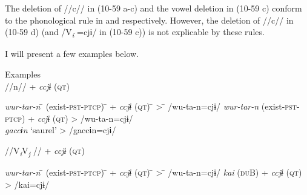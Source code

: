The deletion of //c// in (10-59 a-c) and the vowel deletion in (10-59 c) conform to the phonological rule in  and  respectively. However, the deletion of //c// in (10-59 d) (and /V\textit{\textsubscript{i} }=cjɨ/ in (10-59 c)) is not explicable by these rules.

I will present a few examples below.

\ea\label{ex:10.60}   Examples\\
  \ea //n// + \textit{ccjɨ} (\textsc{qt})\\
  \begin{tabbing}
  \textit{wur-tar-n} \hspace{\tabcolsep}\=\hspace{\tabcolsep} (exist-\textsc{pst}-\textsc{ptcp}) \hspace{\tabcolsep}\=\hspace{\tabcolsep} +  \textit{ccjɨ}  (\textsc{qt}) \hspace{\tabcolsep}\=\hspace{\tabcolsep} > \hspace{\tabcolsep}\=\hspace{\tabcolsep} /wu-ta-n=cjɨ/\kill
  \textit{wur-tar-n} \> (exist-\textsc{pst}-\textsc{ptcp}) \> +  \textit{ccjɨ}  (\textsc{qt}) \> > \> /wu-ta-n=cjɨ/\\
  \textit{gaccɨn} \> ‘saurel’  \> \>      > \> /gaccɨn=cjɨ/
  \end{tabbing}

  \ex //V\textit{\textsubscript{i}}V\textit{\textsubscript{j} }// + \textit{ccjɨ} (\textsc{qt})\\
  \begin{tabbing}
  \textit{wur-tar-n} \hspace{\tabcolsep}\=\hspace{\tabcolsep} (exist-\textsc{pst}-\textsc{ptcp}) \hspace{\tabcolsep}\=\hspace{\tabcolsep} +  \textit{ccjɨ}  (\textsc{qt}) \hspace{\tabcolsep}\=\hspace{\tabcolsep} > \hspace{\tabcolsep}\=\hspace{\tabcolsep} /wu-ta-n=cjɨ/\kill
  \textit{kai} \> (\textsc{du}B) \> +  \textit{ccjɨ}  (\textsc{qt}) \> > \> /kai=cjɨ/
  \end{tabbing}

